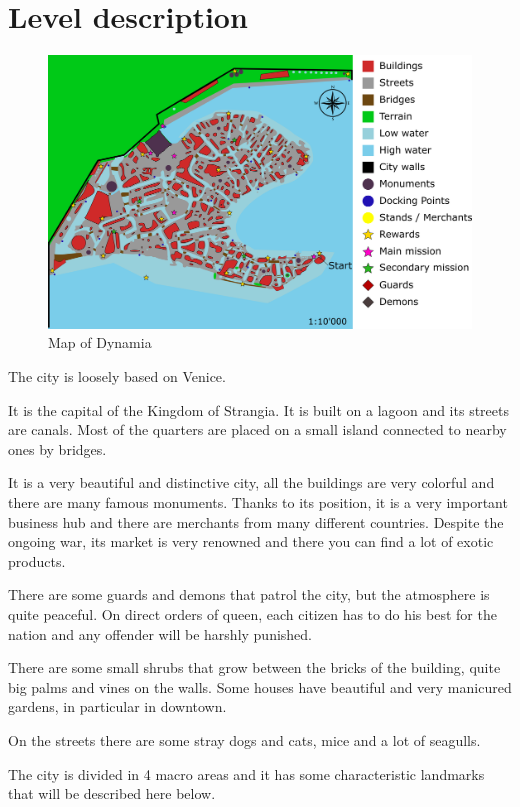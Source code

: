 \section{Level description}

\begin{figure}[H]
  \centering
  \includegraphics[width=\textwidth]{Images/Maps/dynamia}
  \caption{Map of Dynamia}
\end{figure}

The city is loosely based on Venice.

It is the capital of the Kingdom of Strangia. It is built on a lagoon and its streets are canals. Most of the quarters are placed on a small island connected to nearby ones by bridges.

It is a very beautiful and distinctive city, all the buildings are very colorful and there are many famous monuments. Thanks to its position, it is a very important business hub and there are merchants from many different countries. Despite the ongoing war, its market is very renowned and there you can find a lot of exotic products.

There are some guards and demons that patrol the city, but the atmosphere is quite peaceful. On direct orders of queen, each citizen has to do his best for the nation and any offender will be harshly punished.

There are some small shrubs that grow between the bricks of the building, quite big palms and vines on the walls. Some houses have beautiful and very manicured gardens, in particular in downtown.

On the streets there are some stray dogs and cats, mice and a lot of seagulls.

The city is divided in 4 macro areas and it has some characteristic landmarks that will be described here below.

